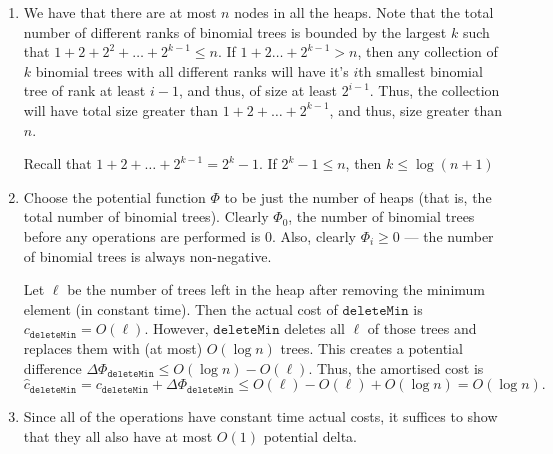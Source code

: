 \documentclass[12 pt, letterpaper]{hmcpset}
\begin{document}
\begin{solution}
\begin{enumerate}
			We always have enough coins to pay for each binomial tree's eventual insertion. This is because every tree already in the array has a coin saved for it. If it is in the array, then a coin was saved for it when it was inserted. This coin is only spent to merge it once some other binomial tree tries to enter the same spot. Then the coin-less tree is removed from the $r$th spot, and eventually when it is inserted, the original coin associated with the binomial tree that tried to take its spot is saved for it.

			Since each binomial tree is accounted for in constant time, the total time is $\ell O(1) = O(\ell)$.

		\item We have that there are at most $n$ nodes in all the heaps. Note that the total number of different ranks of binomial trees is bounded by the largest $k$ such that $1 + 2 + 2^{2} + \dots + 2^{k - 1} \le n$. If $1 + 2 \dots + 2^{k - 1} > n$, then any collection of $k$ binomial trees with all different ranks will have it's $i$th smallest binomial tree of rank at least $i - 1$, and thus, of size at least $2^{i - 1}$. Thus, the collection will have total size greater than $1 + 2 + \dots + 2^{k - 1}$, and thus, size greater than $n$.

			Recall that $1 + 2 + \dots + 2^{k - 1} = 2^{k} - 1$. If $2^{k} - 1 \le n$, then $k \le \log(n + 1)$

		\item Choose the potential function $\Phi$ to be just the number of heaps (that is, the total number of binomial trees). Clearly $\Phi_{0}$, the number of binomial trees before any operations are performed is $0$. Also, clearly $\Phi_{i} \ge 0$ --- the number of binomial trees is always non-negative.

			Let $\ell$ be the number of trees left in the heap after removing the minimum element (in constant time). Then the actual cost of $\mathtt{deleteMin}$ is $c_{\mathtt{deleteMin}} = O(\ell)$. However, $\mathtt{deleteMin}$ deletes all $\ell$ of those trees and replaces them with (at most) $O(\log n)$ trees. This creates a potential difference $\Delta \Phi_{\mathtt{deleteMin}} \le O(\log n) - O(\ell)$. Thus, the amortised cost is
			\[
				\hat{c}_{\mathtt{deleteMin}} = c_{\mathtt{deleteMin}} + \Delta \Phi_{\mathtt{deleteMin}} \le O(\ell) - O(\ell) + O(\log n) = O(\log n).
			\]


		\item Since all of the operations have constant time actual costs, it suffices to show that they all also have at most $O(1)$ potential delta.


\end{enumerate}
\end{solution}
\end{document}
